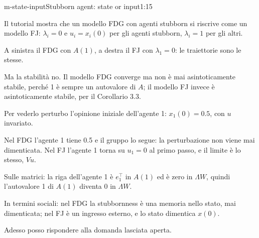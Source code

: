 \begin{slidedue}{m-state-input}{Stubborn agent: state or input}{1:15}
  \begin{discorso}
    \item Il tutorial mostra che un modello FDG con agenti stubborn si riscrive come un modello FJ: $\lambda_i=0$ e $u_i=x_i(0)$ per gli agenti stubborn, $\lambda_i=1$ per gli altri.
    \item A sinistra il FDG con $A(1)$, a destra il FJ con $\lambda_1=0$: le traiettorie sono le stesse.
    \item Ma la stabilità no. Il modello FDG converge ma non è mai asintoticamente stabile, perché 1 è sempre un autovalore di $A$; il modello FJ invece è asintoticamente stabile, per il Corollario 3.3.
    \item \clic Per vederlo perturbo l'opinione iniziale dell'agente 1: $x_1(0)=0.5$, con $u$ invariato.
    \item Nel FDG l'agente 1 tiene 0.5 e il gruppo lo segue: la perturbazione non viene mai dimenticata. Nel FJ l'agente 1 torna su $u_1=0$ al primo passo, e il limite è lo stesso, $Vu$.
    \item Sulle matrici: la riga dell'agente 1 è $e_1^\top$ in $A(1)$ ed è zero in $\Lambda W$, quindi l'autovalore 1 di $A(1)$ diventa 0 in $\Lambda W$.
    \item In termini sociali: nel FDG la stubbornness è una memoria nello stato, mai dimenticata; nel FJ è un ingresso esterno, e lo stato dimentica $x(0)$.
    \item Adesso posso rispondere alla domanda lasciata aperta.
  \end{discorso}
\end{slidedue}

